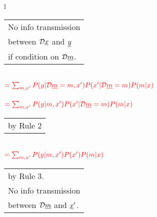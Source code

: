 \begin{longtable}{l}
\begin{tabular}{l}
No info transmission\\
between ${\cal D}{\underline{x}}$ and ${\underline{y}}$\\
if condition on ${\cal D} {\underline{m}}$.
\end{tabular}
\\
$\color{red}=
\sum_{m,x'}
P(y|{\cal D}{\underline{m}}=m, x')
P(x'|{\cal D}{\underline{m}}=m)
P(m|x)$
\\
\\
$\color{red}=
\sum_{m,x'}
P(y|m, x')
P(x'|{\cal D}{\underline{m}}=m)
P(m|x)$
\\
\begin{tabular}{l}
\\
by Rule 2
\end{tabular}
\\
$\color{red}=
\sum_{m,x'}
P(y|m, x')
P(x')
P(m|x)$
\\
\xymatrix{\\=}
\begin{tabular}{l}
\\
by Rule 3.
\\
No info transmission\\
between ${\cal D}{\underline{m}}$ and ${\underline{x}}'$.
\end{tabular}
\end{longtable}



